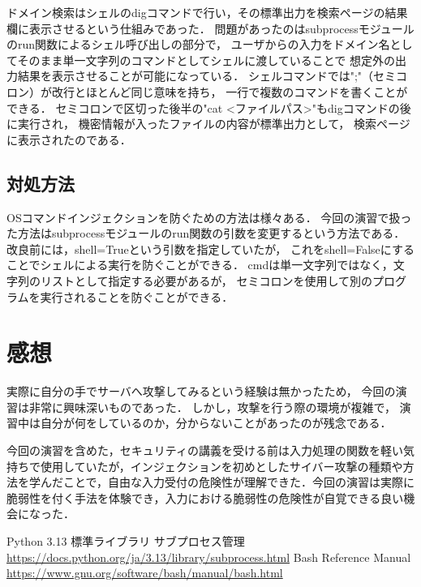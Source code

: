 \documentclass{jlreq}
\begin{document}
ドメイン検索はシェルのdigコマンドで行い，その標準出力を検索ページの結果欄に表示させるという仕組みであった．
問題があったのはsubprocessモジュールのrun関数によるシェル呼び出しの部分で，
ユーザからの入力をドメイン名としてそのまま単一文字列のコマンドとしてシェルに渡していることで
想定外の出力結果を表示させることが可能になっている．
シェルコマンドでは";"（セミコロン）が改行とほとんど同じ意味を持ち，
一行で複数のコマンドを書くことができる．
セミコロンで区切った後半の"cat <ファイルパス>"もdigコマンドの後に実行され，
機密情報が入ったファイルの内容が標準出力として，
検索ページに表示されたのである．

\subsection{対処方法}
OSコマンドインジェクションを防ぐための方法は様々ある．
今回の演習で扱った方法はsubprocessモジュールのrun関数の引数を変更するという方法である．
改良前には，shell=Trueという引数を指定していたが，
これをshell=Falseにすることでシェルによる実行を防ぐことができる．
cmdは単一文字列ではなく，文字列のリストとして指定する必要があるが，
セミコロンを使用して別のプログラムを実行されることを防ぐことができる．

\section{感想}
実際に自分の手でサーバへ攻撃してみるという経験は無かったため，
今回の演習は非常に興味深いものであった．
しかし，攻撃を行う際の環境が複雑で，
演習中は自分が何をしているのか，分からないことがあったのが残念である．

今回の演習を含めた，セキュリティの講義を受ける前は入力処理の関数を軽い気持ちで使用していたが，インジェクションを初めとしたサイバー攻撃の種類や方法を学んだことで，自由な入力受付の危険性が理解できた．今回の演習は実際に脆弱性を付く手法を体験でき，入力における脆弱性の危険性が自覚できる良い機会になった．


\begin{thebibliography}{99}
     Python 3.13 標準ライブラリ サブプロセス管理 \url{https://docs.python.org/ja/3.13/library/subprocess.html}
     Bash Reference Manual \url{https://www.gnu.org/software/bash/manual/bash.html}
\end{thebibliography}
\end{document}
